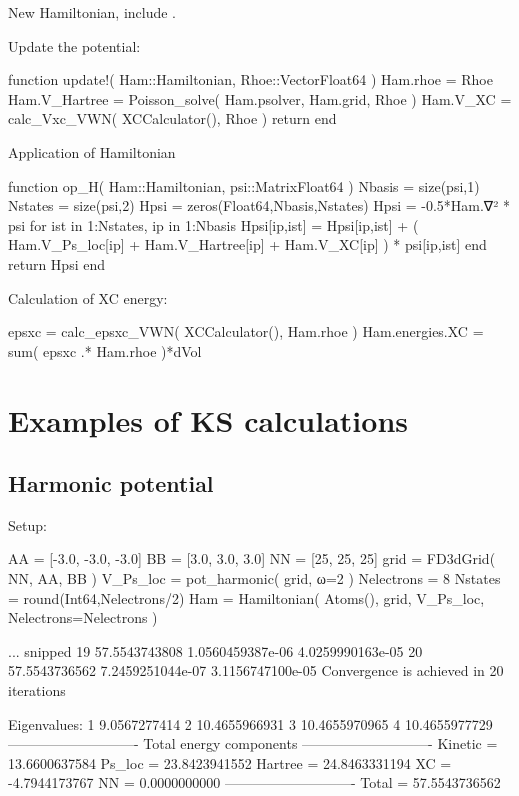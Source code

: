 New Hamiltonian, include .

Update the potential:

\begin{juliacode}
function update!( Ham::Hamiltonian, Rhoe::Vector{Float64} )
  Ham.rhoe = Rhoe
  Ham.V_Hartree = Poisson_solve( Ham.psolver, Ham.grid, Rhoe )
  Ham.V_XC = calc_Vxc_VWN( XCCalculator(), Rhoe )
  return
end
\end{juliacode}

Application of Hamiltonian

\begin{juliacode}
function op_H( Ham::Hamiltonian, psi::Matrix{Float64} )
  Nbasis = size(psi,1)
  Nstates = size(psi,2)
  Hpsi = zeros(Float64,Nbasis,Nstates)
  Hpsi = -0.5*Ham.∇² * psi
  for ist in 1:Nstates, ip in 1:Nbasis
    Hpsi[ip,ist] = Hpsi[ip,ist] + ( Ham.V_Ps_loc[ip] + Ham.V_Hartree[ip] +
                   Ham.V_XC[ip] ) * psi[ip,ist]
  end
  return Hpsi
end
\end{juliacode}

Calculation of XC energy:
\begin{juliacode}
epsxc = calc_epsxc_VWN( XCCalculator(), Ham.rhoe )
Ham.energies.XC = sum( epsxc .* Ham.rhoe )*dVol
\end{juliacode}

\section{Examples of KS calculations}

\subsection{Harmonic potential}

Setup:
\begin{juliacode}
AA = [-3.0, -3.0, -3.0]
BB = [3.0, 3.0, 3.0]
NN = [25, 25, 25]
grid = FD3dGrid( NN, AA, BB )
V_Ps_loc = pot_harmonic( grid, ω=2 )
Nelectrons = 8
Nstates = round(Int64,Nelectrons/2)
Ham = Hamiltonian( Atoms(), grid, V_Ps_loc, Nelectrons=Nelectrons )
\end{juliacode}

\begin{textcode}
... snipped
  19      57.5543743808   1.0560459387e-06   4.0259990163e-05
  20      57.5543736562   7.2459251044e-07   3.1156747100e-05
Convergence is achieved in 20 iterations

Eigenvalues:
 1       9.0567277414
 2      10.4655966931
 3      10.4655970965
 4      10.4655977729
----------------------------
Total energy components
----------------------------
Kinetic =      13.6600637584
Ps_loc  =      23.8423941552
Hartree =      24.8463331194
XC      =      -4.7944173767
NN      =       0.0000000000
----------------------------
Total   =      57.5543736562
\end{textcode}


